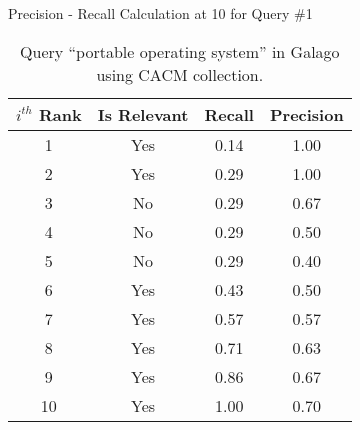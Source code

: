 \begin{table}[!htbp]
	\caption{Precision - Recall Calculation at 10 for Query \#1} \label{tab:rank1cal}
	\begin{center}
	\vspace{-5mm}
		\begin{tabular}{ c | c | c | c}
			\toprule
			\textit{$i^{th}$} Rank & Is Relevant & Recall & Precision\\
			\midrule
			1 & Yes & 0.14 & 1.00\\
			2 & Yes & 0.29 & 1.00\\
			3 & No & 0.29 & 0.67\\
			4 & No & 0.29 & 0.50\\
			5 & No & 0.29 & 0.40\\
			6 & Yes & 0.43 & 0.50\\
			7 & Yes & 0.57 & 0.57\\
			8 & Yes & 0.71 & 0.63\\
			9 & Yes & 0.86 & 0.67\\
			10 & Yes & 1.00 & 0.70\\
			\bottomrule
		\end{tabular}
	\caption*{\scriptsize Query ``portable operating system'' in Galago using CACM collection.}
	 \end{center}
\end{table}
